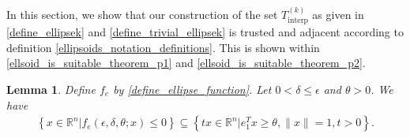 \documentclass{article}
\newtheorem{lemma}[theorem]{Lemma}
\theoremstyle{case}
\numberwithin{theorem}{subsection}
\newcommand{\Rn}{\mathbb R^n}
\newcommand{\sampletrk}{{T_{\text{interp}}^{(k)}}}
\begin{document}
In this section, we show that our construction of the set $\sampletrk$ as given in 
\cref{define_ellipsek} and \cref{define_trivial_ellipsek}
is trusted and adjacent according to definition \cref{ellipsoids_notation_definitions}.
This is shown within \cref{ellsoid_is_suitable_theorem_p1} and \cref{ellsoid_is_suitable_theorem_p2}.

\begin{lemma}
\label{ellipse_in_cone}
Define $f_e$ by \cref{define_ellipse_function}.
Let $0 < \delta \le \epsilon$ and $\theta > 0$.
We have
\begin{align*}
\left\{x \in \Rn | f_e(\epsilon, \delta, \theta; x) \le 0\right\} \subseteq \left\{tx\in\Rn| e_1^T x \ge \theta,\|x\|=1, t>0\right\}.
\end{align*}
\end{lemma}
\end{document}
